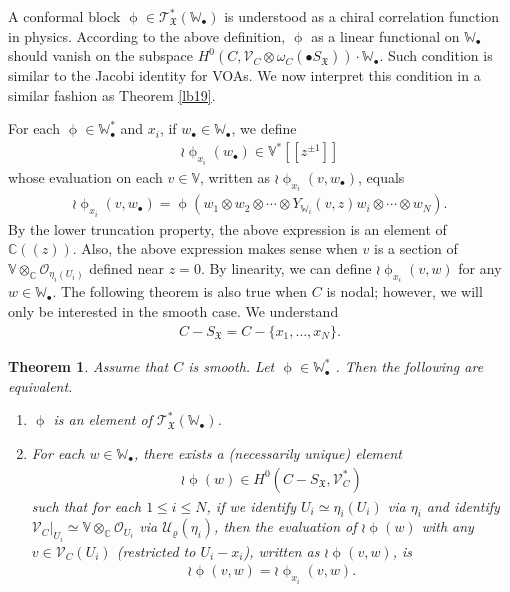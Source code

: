 \documentclass[12pt,a4paper,notitlepage]{report}
\theoremstyle{definition}
\theoremstyle{plain}
\newtheorem{thm}[df]{Theorem}
\newcommand{\fk}{\mathfrak}
\newcommand{\mc}{\mathcal}
\newcommand{\scr}{\mathscr}
\newcommand{\SX}{S_{\fk X}}
\newcommand{\blt}{\bullet}
\newcommand{\Vbb}{\mathbb V}
\newcommand{\Wbb}{\mathbb W}
\newcommand{\Cbb}{\mathbb C}
\numberwithin{equation}{section}
\begin{document}
A conformal block $\upphi\in \scr T_{\fk X}^*(\Wbb_\blt)$ is understood as a chiral correlation function in physics. According to the above definition, $\upphi$ as a linear functional on $\Wbb_\blt$ should vanish on the subspace $H^0(C,\scr V_C\otimes\omega_C(\blt S_{\fk X}))\cdot \Wbb_\blt$. Such condition is similar to the Jacobi identity for VOAs. We now  interpret this condition in a similar fashion as Theorem \ref{lb19}. 

For each $\upphi\in \Wbb_\blt^*$ and $x_i$,  if $w_\blt\in \Wbb_\blt$, we define
\begin{align*}
\wr\upphi_{x_i}(w_\blt)\in \Vbb^*[[z^{\pm1}]]
\end{align*}
whose evaluation on each $v\in \Vbb$, written as $\wr\upphi_{x_i}(v,w_\blt)$, equals
\begin{align}
\wr\upphi_{x_i}(v,w_\blt)=\upphi(w_1\otimes w_2\otimes\cdots\otimes Y_{\Wbb_i}(v,z)w_i\otimes\cdots\otimes w_N).\label{eq125}
\end{align}
By the lower truncation property, the above expression is an element of $\Cbb((z))$. Also, the above expression makes sense when $v$ is a section of $\Vbb\otimes_{\Cbb}\scr O_{\eta_i(U_i)}$ defined near $z=0$. By linearity, we can define $\wr\upphi_{x_i}(v,w)$ for any $w\in\Wbb_\blt$. The following theorem is also true when $C$ is nodal; however, we will only be interested in the smooth case. We \index{CS@$C-\SX,\mc C-\SX,E-\SX$} understand
\begin{align*}
C-\SX=C-\{x_1,\dots,x_N\}.
\end{align*}


\begin{thm}\label{lb32}
Assume that $C$ is smooth. Let $\upphi\in \Wbb_\blt^*$ . Then the following are equivalent.
\begin{enumerate}[label=(\alph*)]
\item $\upphi$ is an element of $\scr T_{\fk X}^*(\Wbb_\blt)$. 
\item For each $w\in\Wbb_\blt$, there exists a (necessarily unique) element 
\begin{align}
\wr\upphi(w)\in H^0(C-S_{\fk X},\scr V_C^*)\label{eq119}
\end{align}
such that for each $1\leq i\leq N$, if we identify $U_i\simeq \eta_i(U_i)$ via $\eta_i$ and identify $\scr V_C|_{U_i}\simeq\Vbb\otimes_\Cbb\scr O_{U_i}$ via $\mc U_\varrho(\eta_i)$, then the evaluation of $\wr\upphi(w)$ with any $v\in\scr V_C(U_i)$ (restricted to $U_i-x_i$), written as $\wr\upphi(v,w)$, is
\begin{align}
\wr\upphi(v,w)=\wr\upphi_{x_i}(v,w).\label{eq229}
\end{align}
\end{enumerate}	
\end{thm}
\end{document}
